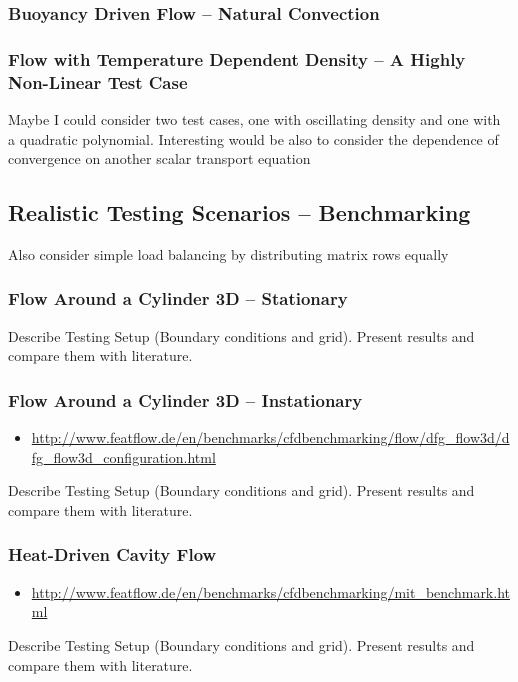 \documentclass[article,type=msc,colorback,accentcolor=tud2a]{tudthesis}
\begin{document}
      \subsubsection{Buoyancy Driven Flow -- Natural Convection}
      \subsubsection{Flow with Temperature Dependent Density -- A Highly Non-Linear Test Case}
        Maybe I could consider two test cases, one with oscillating density and one with a quadratic polynomial. Interesting would be also to consider the dependence of convergence on another scalar transport equation

    \subsection{Realistic Testing Scenarios -- Benchmarking}
        Also consider simple load balancing by distributing matrix rows equally
      
      \subsubsection{Flow Around a Cylinder 3D -- Stationary}
        Describe Testing Setup (Boundary conditions and grid). Present results and compare them with literature.
      \subsubsection{Flow Around a Cylinder 3D -- Instationary}
        \begin{itemize}
          \item\url{http://www.featflow.de/en/benchmarks/cfdbenchmarking/flow/dfg_flow3d/dfg_flow3d_configuration.html}
        \end{itemize}
        Describe Testing Setup (Boundary conditions and grid). Present results and compare them with literature.

      \subsubsection{Heat-Driven Cavity Flow}
        \begin{itemize}
          \item \url{http://www.featflow.de/en/benchmarks/cfdbenchmarking/mit_benchmark.html}
        \end{itemize}
        Describe Testing Setup (Boundary conditions and grid). Present results and compare them with literature.
\end{document}
